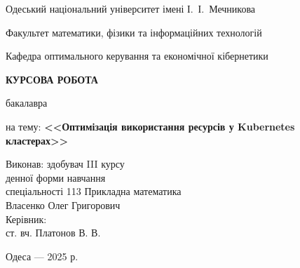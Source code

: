 \thispagestyle{empty}

\begin{center}
Одеський національний університет імені І.~І.~Мечникова

Факультет математики, фізики та інформаційних технологій

Кафедра оптимального керування та економічної кібернетики %
\end{center}

\vfill

\begin{center}
\large
\textbf{КУРСОВА РОБОТА}

бакалавра

\bigskip

на тему: \textbf{<<Оптимізація використання ресурсів у Kubernetes кластерах>>}
\end{center}

\vspace{2cm}

\hfill
\begin{minipage}{0.6\textwidth}
Виконав: здобувач III курсу\\
денної форми навчання\\
спеціальності 113 Прикладна математика\\
Власенко Олег Григорович\\[3\jot] %
Керівник:\\ %
ст. вч. Платонов В. В. %
\end{minipage}

\vfill

\begin{center}
Одеса --- 2025 р.
\end{center}